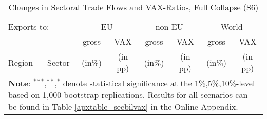 \documentclass[a4paper,12pt]{article}
\begin{document}
\renewcommand{\tabcolsep}{.35cm}
\begin{table}[!tp]\vspace*{-0cm}
 \centering
	\caption{Changes in Sectoral Trade Flows and VAX-Ratios, Full Collapse (S6)}\label{table_secbilvax}
	\vspace{0.25cm}
{\scriptsize
\begin{tabular}{lccccccc}
\toprule
\multicolumn{2}{l}{Exports to:} & \multicolumn{2}{c}{EU}& \multicolumn{2}{c}{non-EU}& \multicolumn{2}{c}{World}\\\cmidrule(rl){3-4}\cmidrule(rl){5-6}\cmidrule(rl){7-8}
 \textit{\textbf{}} &   &  gross & VAX & gross  & VAX & gross  & VAX   \\
\quad Region & Sector & (in\%)&(in pp)& (in\%)&(in pp)& (in\%)&(in pp)\\
\midrule

\bottomrule
\multicolumn{8}{l}{\parbox[t]{5.6in}{\tiny{\textbf{Note}: $^{***}$,$^{**}$,$^{*}$ denote statistical significance at the 1\%,5\%,10\%-level based on 1,000 bootstrap replications. Results for all scenarios can be found in Table \ref{apxtable_secbilvax} in the Online Appendix.}}}
\end{tabular}
}
\end{table}



\begin{table}[!h]\vspace*{-0cm}
\centering
	\caption{Changes in Sectoral Value Added and Shares in Total Value Added}\label{table_outputs}
	\vspace{0.25cm}
\end{table}
\end{document}
